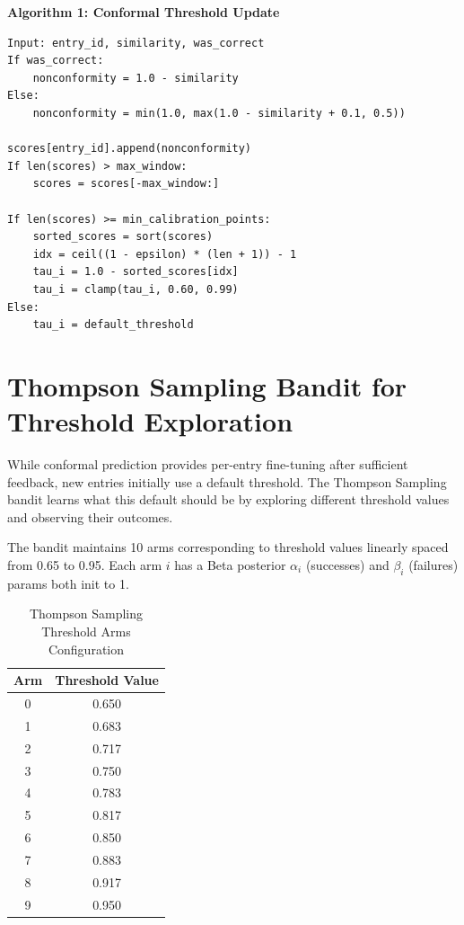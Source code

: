 \documentclass[12pt,a4paper]{report}
\begin{document}
\vspace{6.2cm}

\textbf{Algorithm 1: Conformal Threshold Update}
\begin{lstlisting}
Input: entry_id, similarity, was_correct
If was_correct:
    nonconformity = 1.0 - similarity
Else:
    nonconformity = min(1.0, max(1.0 - similarity + 0.1, 0.5))

scores[entry_id].append(nonconformity)
If len(scores) > max_window:
    scores = scores[-max_window:]

If len(scores) >= min_calibration_points:
    sorted_scores = sort(scores)
    idx = ceil((1 - epsilon) * (len + 1)) - 1
    tau_i = 1.0 - sorted_scores[idx]
    tau_i = clamp(tau_i, 0.60, 0.99)
Else:
    tau_i = default_threshold
\end{lstlisting}

\section{Thompson Sampling Bandit for Threshold Exploration}

While conformal prediction provides per-entry fine-tuning after sufficient feedback, new entries initially use a default threshold. The Thompson Sampling bandit learns what this default should be by exploring different threshold values and observing their outcomes.

The bandit maintains 10 arms corresponding to threshold values linearly spaced from 0.65 to 0.95. Each arm $i$ has a Beta posterior $\alpha_i$ (successes) and $\beta_i$ (failures) params both init to 1.

\begin{table}[H]
\centering
\begin{tabular}{cc}
\toprule
\textbf{Arm} & \textbf{Threshold Value} \\
\midrule
0 & 0.650 \\
1 & 0.683 \\
2 & 0.717 \\
3 & 0.750 \\
4 & 0.783 \\
5 & 0.817 \\
6 & 0.850 \\
7 & 0.883 \\
8 & 0.917 \\
9 & 0.950 \\
\bottomrule
\end{tabular}
\caption{Thompson Sampling Threshold Arms Configuration}
\label{tab:arms}
\end{table}
\end{document}
